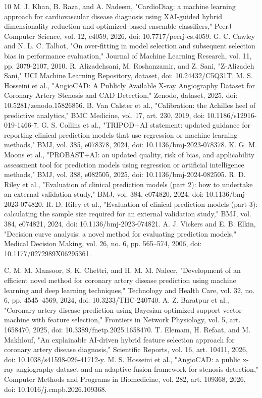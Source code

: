 \documentclass[conference,10pt]{IEEEtran}
\begin{document}
\begin{thebibliography}{10}
 M. J. Khan, B. Raza, and A. Nadeem, "CardioDiag: a machine learning approach for cardiovascular disease diagnosis using XAI-guided hybrid dimensionality reduction and optimized-based ensemble classifiers," PeerJ Computer Science, vol. 12, e4059, 2026, doi: 10.7717/peerj-cs.4059.
 G. C. Cawley and N. L. C. Talbot, "On over-fitting in model selection and subsequent selection bias in performance evaluation," Journal of Machine Learning Research, vol. 11, pp. 2079-2107, 2010.
 R. Alizadehsani, M. Roshanzamir, and Z. Sani, "Z-Alizadeh Sani," UCI Machine Learning Repository, dataset, doi: 10.24432/C5Q31T.
 M. S. Hosseini et al., "AngioCAD: A Publicly Available X-ray Angiography Dataset for Coronary Artery Stenosis and CAD Detection," Zenodo, dataset, 2025, doi: 10.5281/zenodo.15826856.
 B. Van Calster et al., "Calibration: the Achilles heel of predictive analytics," BMC Medicine, vol. 17, art. 230, 2019, doi: 10.1186/s12916-019-1466-7.
 G. S. Collins et al., "TRIPOD+AI statement: updated guidance for reporting clinical prediction models that use regression or machine learning methods," BMJ, vol. 385, e078378, 2024, doi: 10.1136/bmj-2023-078378.
 K. G. M. Moons et al., "PROBAST+AI: an updated quality, risk of bias, and applicability assessment tool for prediction models using regression or artificial intelligence methods," BMJ, vol. 388, e082505, 2025, doi: 10.1136/bmj-2024-082505.
 R. D. Riley et al., "Evaluation of clinical prediction models (part 2): how to undertake an external validation study," BMJ, vol. 384, e074820, 2024, doi: 10.1136/bmj-2023-074820.
 R. D. Riley et al., "Evaluation of clinical prediction models (part 3): calculating the sample size required for an external validation study," BMJ, vol. 384, e074821, 2024, doi: 10.1136/bmj-2023-074821.
 A. J. Vickers and E. B. Elkin, "Decision curve analysis: a novel method for evaluating prediction models," Medical Decision Making, vol. 26, no. 6, pp. 565--574, 2006, doi: 10.1177/0272989X06295361.

 C. M. M. Mansoor, S. K. Chettri, and H. M. M. Naleer, "Development of an efficient novel method for coronary artery disease prediction using machine learning and deep learning techniques," Technology and Health Care, vol. 32, no. 6, pp. 4545--4569, 2024, doi: 10.3233/THC-240740.
 A. Z. Baratpur et al., "Coronary artery disease prediction using Bayesian-optimized support vector machine with feature selection," Frontiers in Network Physiology, vol. 5, art. 1658470, 2025, doi: 10.3389/fnetp.2025.1658470.
 T. Elemam, H. Refaat, and M. Makhlouf, "An explainable AI-driven hybrid feature selection approach for coronary artery disease diagnosis," Scientific Reports, vol. 16, art. 10411, 2026, doi: 10.1038/s41598-026-41712-y.
 M. S. Hosseini et al., "AngioCAD: a public x-ray angiography dataset and an adaptive fusion framework for stenosis detection," Computer Methods and Programs in Biomedicine, vol. 282, art. 109368, 2026, doi: 10.1016/j.cmpb.2026.109368.

\end{thebibliography}
\end{document}
